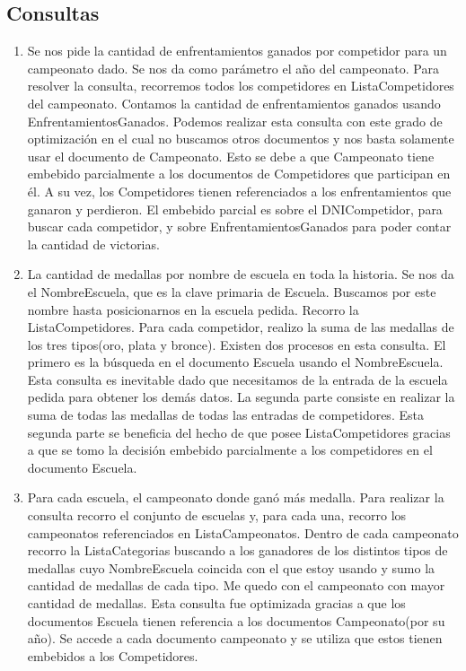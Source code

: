 \subsection{Consultas}
\begin{enumerate}
\item Se nos pide la cantidad de enfrentamientos ganados por competidor para un campeonato dado. Se nos da como parámetro
el año del campeonato. Para resolver la consulta, recorremos todos los competidores en ListaCompetidores del campeonato.
Contamos la cantidad de enfrentamientos ganados usando EnfrentamientosGanados. Podemos realizar esta consulta con este
grado de optimización en el cual no buscamos otros documentos y nos basta solamente usar el documento de Campeonato. Esto
se debe a que Campeonato tiene embebido parcialmente a los documentos de Competidores que participan en él. A su vez, los
Competidores tienen referenciados a los enfrentamientos que ganaron y perdieron. El embebido parcial es sobre el
DNICompetidor, para buscar cada competidor, y sobre EnfrentamientosGanados para poder contar la cantidad de victorias.

\item La cantidad de medallas por nombre de escuela en toda la historia. Se nos da el NombreEscuela, que es la clave primaria de Escuela.
Buscamos por este nombre hasta posicionarnos en la escuela pedida. Recorro la ListaCompetidores. Para cada competidor, realizo la suma de las medallas de los
tres tipos(oro, plata y bronce). Existen dos procesos en esta consulta. El primero es la búsqueda en el documento Escuela
usando el NombreEscuela. Esta consulta es inevitable dado que necesitamos de la entrada de la escuela pedida para obtener
los demás datos. La segunda parte consiste en realizar la suma de todas las medallas de todas las entradas de
competidores. Esta segunda parte se beneficia del hecho de que posee ListaCompetidores gracias a que se tomo la decisión
embebido parcialmente a los competidores en el documento Escuela.

\item Para cada escuela, el campeonato donde ganó más medalla. Para realizar la consulta recorro el conjunto de
escuelas y, para cada una, recorro los campeonatos referenciados en ListaCampeonatos. Dentro de cada
campeonato recorro la ListaCategorias buscando a los ganadores de los distintos tipos de medallas cuyo NombreEscuela
coincida con el que estoy usando y sumo la cantidad de medallas de cada tipo. Me quedo con el campeonato con mayor
cantidad de medallas. Esta consulta fue optimizada gracias a que los documentos Escuela tienen referencia a los documentos
Campeonato(por su año). Se accede a cada documento campeonato y se utiliza que estos tienen embebidos a los Competidores.


\end{enumerate}
